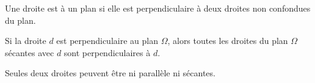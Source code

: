 \begin{definition}
    Une droite est  à un plan si elle est perpendiculaire à deux droites non confondues du plan.
\end{definition}

\begin{Aretenir}
    Si la droite \( d\) est perpendiculaire au plan \( \Omega\), alors toutes les droites du plan \( \Omega\) sécantes avec \( d\) sont perpendiculaires à \( d\).
\end{Aretenir}


\begin{remark}
    Seules deux droites peuvent être ni parallèle ni sécantes.
\end{remark}
